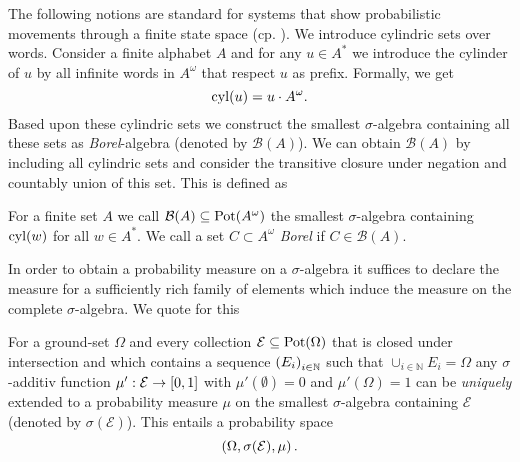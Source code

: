 The following notions are standard for systems that show probabilistic 
movements through a finite state space (cp. 
\cite{RandomnessForFree,AlgorithmsForPOSG}). We introduce cylindric sets over 
words. Consider a finite alphabet $A$ and for any $u\in A^{*}$ we introduce the 
cylinder of $u$ by all infinite words in $A^{\omega}$ that respect $u$ as 
prefix. Formally, we get
\begin{equation*}
  \operatorname{cyl}(u) = u\cdot A^{\omega}.
\end{equation*}
Based upon these cylindric sets we construct the smallest $\sigma$-algebra
containing all these sets  as \emph{Borel}-algebra (denoted by 
$\mathcal{B}(A)$). We can obtain $\mathcal{B}(A)$ by including all cylindric 
sets and consider the transitive closure under negation and countably union of 
this set. This is defined as
\begin{definition}
  For a finite set $A$ we call $\mathcal{B}(A)\subseteq\operatorname{Pot}(A^{\omega})$ the 
  smallest $\sigma$-algebra containing $\operatorname{cyl}(w)$ for all $w\in A^{*}$. We call
  a set $C\subset A^{\omega}$ \emph{Borel} if $C\in\mathcal{B}(A)$.
  \label{def:borelalgebra}
\end{definition}

In order to obtain a probability measure on a $\sigma$-algebra it suffices to
declare the measure for a sufficiently rich family of elements which induce the
measure on the complete $\sigma$-algebra. We quote for this
\begin{theorem}
  \cite[Theorem 2.4, Theorem 5.6]{Bauer}
  For a ground-set $\Omega$ and every collection
  $\mathcal{E}\subseteq\operatorname{Pot}(\Omega)$ that is closed under intersection and
  which contains a sequence $\left(E_{i}\right)_{i\in\mathbb{N}}$ such that
  $\cup_{i\in\mathbb{N}}E_{i} = \Omega$ any $\sigma$-additiv function
  $\mu':\mathcal{E}\rightarrow\left[0, 1\right]$
  with $\mu'(\emptyset) = 0$ and $\mu'(\Omega) = 1$ can be \emph{uniquely}
  extended to a probability measure $\mu$ on the smallest $\sigma$-algebra
  containing $\mathcal{E}$ (denoted by $\sigma(\mathcal{E})$). This entails a
  probability space
  \begin{equation*}
    \left(\Omega, \sigma(\mathcal{E}), \mu\right).
  \end{equation*}
  \label{thm:measureext}
\end{theorem}

